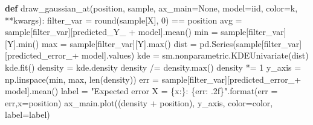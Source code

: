 \documentclass[]{tufte-book}
\newenvironment{Shaded}{}{}
\newcommand{\BuiltInTok}[1]{#1}
\newcommand{\DecValTok}[1]{\textcolor[rgb]{0.25,0.63,0.44}{#1}}
\newcommand{\KeywordTok}[1]{\textcolor[rgb]{0.00,0.44,0.13}{\textbf{#1}}}
\newcommand{\NormalTok}[1]{#1}
\newcommand{\OperatorTok}[1]{\textcolor[rgb]{0.40,0.40,0.40}{#1}}
\newcommand{\SpecialCharTok}[1]{\textcolor[rgb]{0.25,0.44,0.63}{#1}}
\newcommand{\StringTok}[1]{\textcolor[rgb]{0.25,0.44,0.63}{#1}}
\newcommand{\VariableTok}[1]{\textcolor[rgb]{0.10,0.09,0.49}{#1}}
\theoremstyle{definition}
\theoremstyle{definition}
\theoremstyle{definition}
\theoremstyle{remark}
\begin{document}
\begin{Shaded}
\begin{Highlighting}[]
\KeywordTok{def}\NormalTok{ draw\_gaussian\_at(position, sample, ax\_main}\OperatorTok{=}\VariableTok{None}\NormalTok{, model}\OperatorTok{=}\StringTok{\textquotesingle{}iid\textquotesingle{}}\NormalTok{, color}\OperatorTok{=}\StringTok{\textquotesingle{}k\textquotesingle{}}\NormalTok{, }\OperatorTok{**}\NormalTok{kwargs):}
\NormalTok{    filter\_var }\OperatorTok{=} \BuiltInTok{round}\NormalTok{(sample[}\StringTok{\textquotesingle{}X\textquotesingle{}}\NormalTok{], }\DecValTok{0}\NormalTok{) }\OperatorTok{==}\NormalTok{ position}
\NormalTok{    avg }\OperatorTok{=}\NormalTok{ sample[filter\_var][}\StringTok{\textquotesingle{}predicted\_Y\_\textquotesingle{}} \OperatorTok{+}\NormalTok{ model].mean()}
    \BuiltInTok{min} \OperatorTok{=}\NormalTok{ sample[filter\_var][}\StringTok{\textquotesingle{}Y\textquotesingle{}}\NormalTok{].}\BuiltInTok{min}\NormalTok{()}
    \BuiltInTok{max} \OperatorTok{=}\NormalTok{ sample[filter\_var][}\StringTok{\textquotesingle{}Y\textquotesingle{}}\NormalTok{].}\BuiltInTok{max}\NormalTok{()}
\NormalTok{    dist }\OperatorTok{=}\NormalTok{ pd.Series(sample[filter\_var][}\StringTok{\textquotesingle{}predicted\_error\_\textquotesingle{}}\OperatorTok{+}\NormalTok{ model].values)}
\NormalTok{    kde }\OperatorTok{=}\NormalTok{ sm.nonparametric.KDEUnivariate(dist)}
\NormalTok{    kde.fit()}
\NormalTok{    density }\OperatorTok{=}\NormalTok{ kde.density}
\NormalTok{    density }\OperatorTok{/=}\NormalTok{ density.}\BuiltInTok{max}\NormalTok{()}
\NormalTok{    density }\OperatorTok{*=} \DecValTok{1}
\NormalTok{    y\_axis }\OperatorTok{=}\NormalTok{ np.linspace(}\BuiltInTok{min}\NormalTok{, }\BuiltInTok{max}\NormalTok{, }\BuiltInTok{len}\NormalTok{(density))}
\NormalTok{    err }\OperatorTok{=}\NormalTok{ sample[filter\_var][}\StringTok{\textquotesingle{}predicted\_error\_\textquotesingle{}}\OperatorTok{+}\NormalTok{ model].mean()}
\NormalTok{    label }\OperatorTok{=} \StringTok{"Expected error X = }\SpecialCharTok{\{x:\}}\StringTok{: }\SpecialCharTok{\{err: .2f\}}\StringTok{"}\NormalTok{.}\BuiltInTok{format}\NormalTok{(err }\OperatorTok{=}\NormalTok{ err,x}\OperatorTok{=}\NormalTok{position)}
\NormalTok{    ax\_main.plot((density }\OperatorTok{+}\NormalTok{ position), y\_axis, color}\OperatorTok{=}\NormalTok{color, label}\OperatorTok{=}\NormalTok{label)}


\end{Highlighting}
\end{Shaded}
\end{document}
